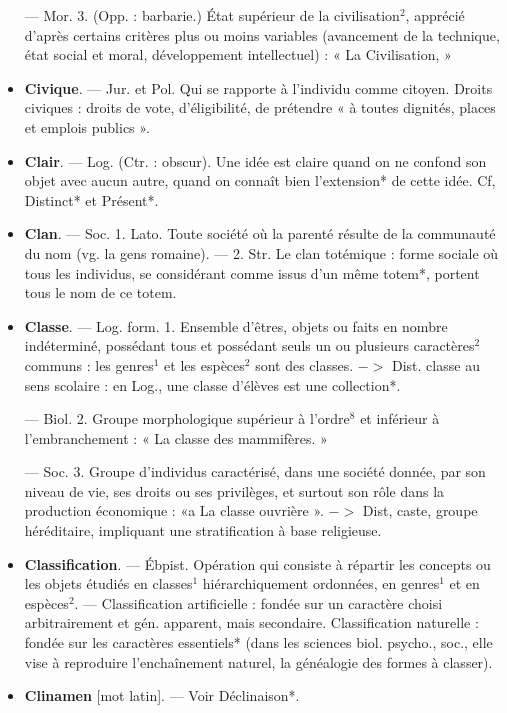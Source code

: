\begin{itemize}[leftmargin=1cm, label=, itemsep=11pt]
— Mor. 3. (Opp. : barbarie.) État
supérieur de la civilisation$^2$, apprécié d’après certains critères plus ou
moins variables (avancement de la
technique, état social et moral, développement intellectuel) : « La Civilisation, »

\item {\bf Civique}. — Jur. et Pol. Qui se rapporte à l'individu comme citoyen.
Droits civiques : droits de vote,
d'éligibilité, de prétendre « à toutes
dignités, places et emplois publics ».

\item {\bf Clair}. — Log. (Ctr. : obscur). Une idée
est claire quand on ne confond son
objet avec aucun autre, quand on
connaît bien l’extension* de cette
idée. Cf, Distinct* et Présent*.

\item {\bf Clan}. — Soc. 1. Lato. Toute société
où la parenté résulte de la communauté du nom (vg. la gens romaine).
— 2. Str. Le clan totémique : forme
sociale où tous les individus, se
considérant comme issus d’un même
totem*, portent tous le nom de ce
totem.

\item {\bf Classe}. — Log. form. 1. Ensemble
d'êtres, objets ou faits en nombre
indéterminé, possédant tous et possédant seuls un ou plusieurs caractères$^2$ communs : les genres$^1$ et les
espèces$^2$ sont des classes. $->$ Dist.
classe au sens scolaire : en Log., une
classe d’élèves est une collection*.

— Biol. 2. Groupe morphologique supérieur à l’ordre$^8$ et inférieur à l’embranchement : « La classe
des mammifères. »

— Soc. 3. Groupe d'individus
caractérisé, dans une société donnée,
par son niveau de vie, ses droits ou
ses privilèges, et surtout son rôle
dans la production économique :
«a La classe ouvrière ». $->$ Dist,
caste, groupe héréditaire, impliquant
une stratification à base religieuse.

\item {\bf Classification}. — Ébpist. Opération qui
consiste à répartir les concepts ou
les objets étudiés en classes$^1$ hiérarchiquement ordonnées, en genres$^1$
et en espèces$^2$. — Classification artificielle : fondée sur un caractère
choisi arbitrairement et gén. apparent, mais secondaire. Classification
naturelle : fondée sur les caractères
essentiels* (dans les sciences biol.
psycho., soc., elle vise à reproduire
l’enchaînement naturel, la généalogie des formes à classer).

\item {\bf Clinamen} [mot latin]. — Voir Déclinaison*.


\end{itemize}
